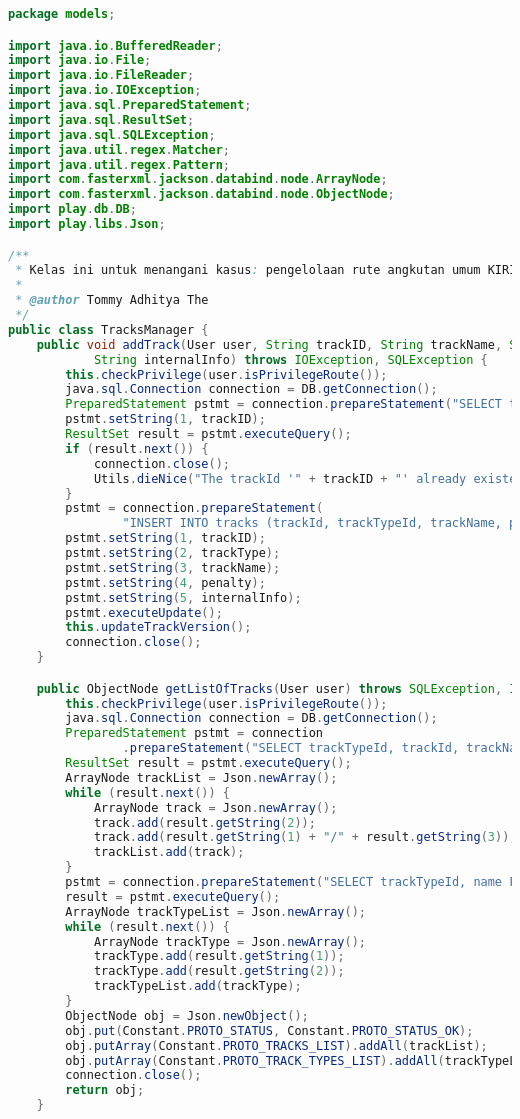\begin{lstlisting}[language=Java,basicstyle=\tiny,caption=models/TracksManager.java,label={lst:tracksmanager.java}]
package models;

import java.io.BufferedReader;
import java.io.File;
import java.io.FileReader;
import java.io.IOException;
import java.sql.PreparedStatement;
import java.sql.ResultSet;
import java.sql.SQLException;
import java.util.regex.Matcher;
import java.util.regex.Pattern;
import com.fasterxml.jackson.databind.node.ArrayNode;
import com.fasterxml.jackson.databind.node.ObjectNode;
import play.db.DB;
import play.libs.Json;

/**
 * Kelas ini untuk menangani kasus: pengelolaan rute angkutan umum KIRI
 * 
 * @author Tommy Adhitya The
 */
public class TracksManager {
	public void addTrack(User user, String trackID, String trackName, String trackType, String penalty,
			String internalInfo) throws IOException, SQLException {
		this.checkPrivilege(user.isPrivilegeRoute());
		java.sql.Connection connection = DB.getConnection();
		PreparedStatement pstmt = connection.prepareStatement("SELECT trackId FROM tracks WHERE trackId=?");
		pstmt.setString(1, trackID);
		ResultSet result = pstmt.executeQuery();
		if (result.next()) {
			connection.close();
			Utils.dieNice("The trackId '" + trackID + "' already existed.");
		}
		pstmt = connection.prepareStatement(
				"INSERT INTO tracks (trackId, trackTypeId, trackName, penalty, internalInfo) VALUES (?,?,?,?,?)");
		pstmt.setString(1, trackID);
		pstmt.setString(2, trackType);
		pstmt.setString(3, trackName);
		pstmt.setString(4, penalty);
		pstmt.setString(5, internalInfo);
		pstmt.executeUpdate();
		this.updateTrackVersion();
		connection.close();
	}

	public ObjectNode getListOfTracks(User user) throws SQLException, IOException {
		this.checkPrivilege(user.isPrivilegeRoute());
		java.sql.Connection connection = DB.getConnection();
		PreparedStatement pstmt = connection
				.prepareStatement("SELECT trackTypeId, trackId, trackName FROM tracks ORDER BY trackTypeId, trackId");
		ResultSet result = pstmt.executeQuery();
		ArrayNode trackList = Json.newArray();
		while (result.next()) {
			ArrayNode track = Json.newArray();
			track.add(result.getString(2));
			track.add(result.getString(1) + "/" + result.getString(3));
			trackList.add(track);
		}
		pstmt = connection.prepareStatement("SELECT trackTypeId, name FROM tracktypes ORDER BY trackTypeId");
		result = pstmt.executeQuery();
		ArrayNode trackTypeList = Json.newArray();
		while (result.next()) {
			ArrayNode trackType = Json.newArray();
			trackType.add(result.getString(1));
			trackType.add(result.getString(2));
			trackTypeList.add(trackType);
		}
		ObjectNode obj = Json.newObject();
		obj.put(Constant.PROTO_STATUS, Constant.PROTO_STATUS_OK);
		obj.putArray(Constant.PROTO_TRACKS_LIST).addAll(trackList);
		obj.putArray(Constant.PROTO_TRACK_TYPES_LIST).addAll(trackTypeList);
		connection.close();
		return obj;
	}


\end{lstlisting}
